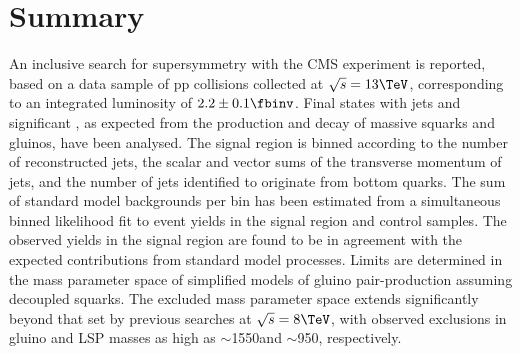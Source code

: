 \section{Summary}
\label{sec:summary}

An inclusive search for supersymmetry with the CMS experiment is
reported, based on a data sample of pp collisions collected at
$\sqrt{s} = 13\TeV$, corresponding to an integrated luminosity of $2.2
\pm 0.1 \fbinv$. Final states with jets and significant \ETmiss, as
expected from the production and decay of massive squarks and gluinos,
have been analysed. The signal region is binned according to the
number of reconstructed jets, the scalar and vector sums of the
transverse momentum of jets, and the number of jets identified to
originate from bottom quarks. The sum of standard model backgrounds
per bin has been estimated from a simultaneous binned likelihood fit
to event yields in the signal region and control samples. The observed
yields in the signal region are found to be in agreement with the
expected contributions from standard model processes. Limits are
determined in the mass parameter space of simplified models of gluino
pair-production assuming decoupled squarks. The excluded mass
parameter space extends significantly beyond that set by previous
searches at $\sqrt{s} = 8\TeV$, with observed exclusions in gluino and
LSP masses as high as $\sim$1550\gev and $\sim$950\gev, respectively.

